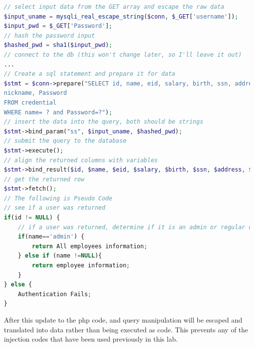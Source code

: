 \documentclass[14pt]{extarticle}
\begin{document}
\begin{lstlisting}[language=php]
// select input data from the GET array and escape the raw data
$input_uname = mysqli_real_escape_string($conn, $_GET['username']);
$input_pwd = $_GET['Password'];
// hash the password input
$hashed_pwd = sha1($input_pwd);
// connect to the db (this won't change later, so I'll leave it out)
...
// Create a sql statement and prepare it for data
$stmt = $conn->prepare("SELECT id, name, eid, salary, birth, ssn, address, email,
nickname, Password
FROM credential
WHERE name= ? and Password=?");
// insert the data into the query, both should be strings
$stmt->bind_param("ss", $input_uname, $hashed_pwd);
// submit the query to the database
$stmt->execute();
// align the returned columns with variables
$stmt->bind_result($id, $name, $eid, $salary, $birth, $ssn, $address, $email);
// get the returned row
$stmt->fetch();
// The following is Pseudo Code
// see if a user was returned
if(id != NULL) {
	// if a user was returned, determine if it is an admin or regular user
	if(name=='admin') {
		return All employees information;
	} else if (name !=NULL){
		return employee information;
	}
} else {
	Authentication Fails;
}
\end{lstlisting}
After this update to the php code, and query manipulation will be escaped and translated into data rather than being executed as code. This prevents any of the injection codes that have been used previously in this lab.
\newpage


\end{document}
